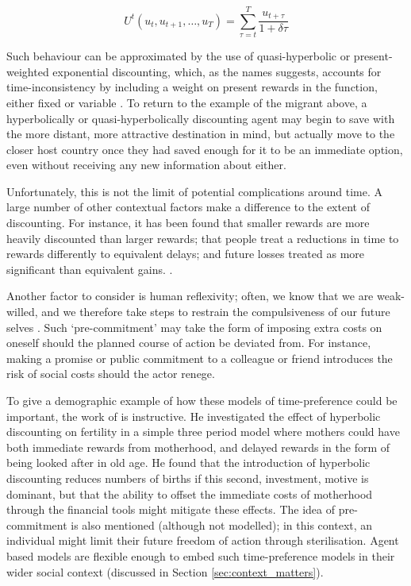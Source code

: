 \documentclass{article}
\begin{document}
\[
U^{t}(u_t, u_{t+1},\dots,u_T ) = \sum_{\tau=t}^{T} \frac{ u_{t+\tau}}{1+\delta\tau}
\]



Such behaviour can be approximated by the use of quasi-hyperbolic or present-weighted exponential discounting, which, as the names suggests, accounts for time-inconsistency by including a weight on present rewards in the function, either fixed or variable \citep{Benhabib2010}. To return to the example of the migrant above, a hyperbolically or quasi-hyperbolically discounting agent may begin to save with the more distant, more attractive destination in mind, but actually move to the closer host country once they had saved enough for it to be an immediate option, even without receiving any new information about either.

Unfortunately, this is not the limit of potential complications around time. A large number of other contextual factors make a difference to the extent of discounting. For instance, it has been found that smaller rewards are more heavily discounted than larger rewards; that people treat a reductions in time to rewards differently to equivalent delays; and future losses treated as more significant than equivalent gains. \citep{Read2000}.

Another factor to consider is human reflexivity; often, we know that we are weak-willed, and we therefore take steps to restrain the compulsiveness of our future selves \citep{ODonoghue2000}. Such `pre-commitment' may take the form of imposing extra costs on oneself should the planned course of action be deviated from. For instance, making a promise or public commitment to a colleague or friend introduces the risk of social costs should the actor renege.


To give a demographic example of how these models of time-preference could be important, the work of  \cite{Wrede2011} is instructive. He investigated the effect of hyperbolic discounting on fertility in a simple three period model where mothers could have both immediate rewards from motherhood, and delayed rewards in the form of being looked after in old age. He found that the introduction of hyperbolic discounting reduces numbers of births if this second, investment, motive is dominant, but that the ability to offset the immediate costs of motherhood through the financial tools might mitigate these effects. The idea of pre-commitment is also mentioned (although not modelled); in this context, an individual might limit their future freedom of action through sterilisation. Agent based models are flexible enough to embed such time-preference models in their wider social context (discussed in Section \ref{sec:context_matters}).
\end{document}
